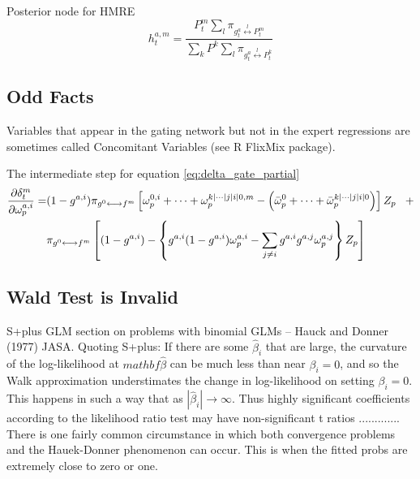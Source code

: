 \documentclass[12pt]{article}
\newcommand{\mean}[1]{\bar{#1}}
\newcommand{\gateprod}[2]{\pi_{#1 \longleftrightarrow #2}}
\newcommand{\sumgateprod}[3]{\pi_{#1 \overset{#3}{\longleftrightarrow} #2}}
\newcommand{\shortsum}[1]{\sum \nolimits_{#1}}
\begin{document}
Posterior node for HMRE
\begin{equation} 
  h^{a,m}_{t} = \frac{P^{m}_{t} \shortsum{l} \sumgateprod{g^{a}_{t}}{P^{m}_{t}}{l}}{\sum_{k} P^{k} \shortsum{l} \sumgateprod{g^{a}_{t}}{P^{k}_{t}}{l}}
\end{equation}



\subsection{Odd Facts}

Variables that appear in the gating network but not in the expert regressions
are sometimes called Concomitant Variables (see R FlixMix package).

The intermediate step for equation \ref{eq:delta_gate_partial}
\begin{equation}
  \begin{split} \notag
    \frac{\partial \delta^{m}_{t}}{\partial \omega^{a,i}_{p}} =& (1 - g^{a,i})  \gateprod{g^{0}}{f^{m}}  \left[ \omega^{0, i}_{p} + \cdots + \omega^{k|\cdots|j|i|0, m}_{p} - \left( \mean{\omega}^{0}_{p} + \cdots + \mean{\omega}^{k|\cdots|j|i|0}_{p} \right) \right] Z_{p} \,\,\,\,\, + \\ 
    &\gateprod{g^{0}}{f^{m}} \left[ (1 - g^{a,i})  - \left\{ g^{a,i} (1 - g^{a,i}) \omega^{a,i}_{p} - \sum_{j \neq i} g^{a,i} g^{a,j} \omega^{a,j}_{p} \right\}  Z_{p}  \right]
  \end{split} 
\end{equation}


\subsection{Wald Test is Invalid}
S+plus GLM section on problems with binomial GLMs
  -- Hauck and Donner (1977) JASA. Quoting S+plus: If there are
  some $\hat{\beta}_{i}$ that are large, the curvature of the log-likelihood at
  $mathbf{\hat{\beta}}$ can be much less than near $\beta_{i}=0$, and so the Walk
  approximation understimates the change in log-likelihood on setting $\beta_{i}=0$.
  This happens in such a way that as $|\hat{\beta}_{i}| \rightarrow \infty$. Thus
  highly significant coefficients according to the likelihood ratio test may have
  non-significant t ratios ............. There is one fairly common circumstance
  in which both convergence problems and the Hauek-Donner phenomenon can occur.
  This is when the fitted probs are extremely close to zero or one.
\end{document}
